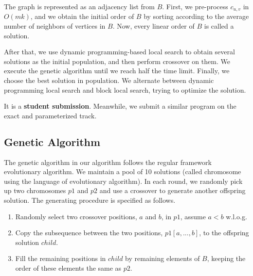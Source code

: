 \documentclass[a4paper,ctexart,UKenglish,cleveref, autoref, thm-restate]{lipics-v2021}
\begin{document}
The graph is represented as an adjacency list from $B$.
First, we pre-process $c_{u,v}$ in $O(mk)$, and we obtain the initial order of $B$ by sorting according to the average number of neighbors of vertices in $B$.
Now, every linear order of $B$ is called a solution.

After that, we use dynamic programming-based local search to obtain several solutions as the initial population, and then perform crossover on them. We execute the genetic algorithm until we reach half the time limit.
Finally, we choose the best solution in population. 
We alternate between dynamic programming local search and block local search, trying to optimize the solution. 

It is a \textbf{student submission}. Meanwhile, we submit a similar program on the exact and parameterized track.


\subsection{Genetic Algorithm}

The genetic algorithm in our algorithm follows the regular framework evolutionary algorithm.
We maintain a pool of 10 solutions (called chromosome using the language of evolutionary algorithm).
In each round, we randomly pick up two chromosomes $p1$ and $p2$ and use a crossover to generate another offspring solution.
The generating procedure is specified as follows.


\begin{enumerate}
    \item Randomly select two crossover positions, $a$ and $b$, in $p1$, assume $a<b$ w.l.o.g.
    \item Copy the subsequence between the two positions, $p1[a,...,b]$, to the offspring solution $child$.
   \item  Fill the remaining positions in $child$ by remaining elements of $B$, keeping the order of these elements the same as $p2$.   
\end{enumerate}
\end{document}
